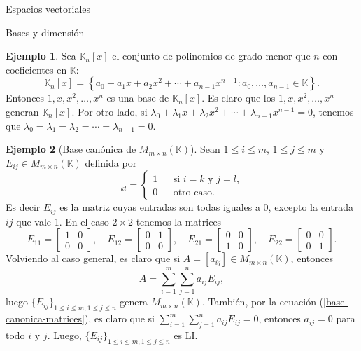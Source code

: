 \documentclass[a4paper,12pt,twoside,spanish]{amsbook}
\theoremstyle{definition}
\newtheorem{ejemplo}{Ejemplo}[section]
\theoremstyle{remark}
\newcommand{\K}{\mathbb K}
\begin{document}
\begin{chapter}{Espacios vectoriales}
\begin{section}{Bases y dimensión}
\begin{ejemplo}
	Sea $\K_n[x]$  el conjunto de polinomios de grado menor  que $n$ con coeficientes en $\K$:
	$$
	\K_n[x] = \left\{a_0 + a_1 x + a_2x^2+\cdots+a_{n-1}x^{n-1}: a_0,\ldots,a_{n-1} \in \K  \right\}.
	$$
	Entonces $1,x,x^2,\ldots,x^n$  es una base de $\K_n[x]$. Es claro que los $1,x,x^2,\ldots,x^n$ generan $\K_n[x]$. Por otro lado, si  $\lambda_0 + \lambda_1 x + \lambda_2x^2+\cdots+\lambda_{n-1}x^{n-1} =0$, tenemos que $\lambda_0=\lambda_1 = \lambda_2 =\cdots =\lambda_{n-1} =0$.
\end{ejemplo}

\begin{ejemplo}[{\sc Base canónica de $M_{m \times n}(\K)$}] 
	Sean $1 \le i \le m$, $1\le j \le m$ y $E_{ij} \in M_{m \times n}(\K)$ definida por
	\begin{equation*}
		[E_{ij}]_{kl} = \left\{ 
		\begin{array}{lll}
		1& &\text{si $i=k$ y $j=l$,} \\
		0& &\text{otro caso}. 
		\end{array}
		 \right.
	\end{equation*}
	Es decir $E_{ij}$  es la matriz cuyas entradas son todas iguales a 0,  excepto la entrada $ij$ que vale 1. En el caso $2 \times 2$  tenemos la matrices
	\begin{equation*}
		E_{11} = \begin{bmatrix} 1&0\\0&0\end{bmatrix}, \quad
		E_{12} = \begin{bmatrix} 0&1\\0&0\end{bmatrix}, \quad
		E_{21} = \begin{bmatrix} 0&0\\1&0\end{bmatrix}, \quad
		E_{22} = \begin{bmatrix} 0&0\\0&1\end{bmatrix}.
	\end{equation*}
	Volviendo al caso general,  es claro que si $A= [a_{ij}] \in M_{m \times n}(\K)$,  entonces
	\begin{equation}\label{base-canonica-matrices}
		A = \sum_{i=1}^{m} \sum_{j=1}^{n} a_{ij}E_{ij},
	\end{equation}
	luego $\{E_{ij} \}_{1 \le i \le m, 1\le j \le n}$ genera $M_{m \times n}(\K)$. También, por la ecuación (\ref{base-canonica-matrices}), es claro que si $\sum_{i=1}^{m} \sum_{j=1}^{n} a_{ij}E_{ij}=0$,  entonces $a_{ij}=0$ para todo $i$ y $j$. Luego,  $\{E_{ij} \}_{1 \le i \le m, 1\le j \le n}$ es LI. 
	

\end{ejemplo}
\end{section}
\end{chapter}
\end{document}
